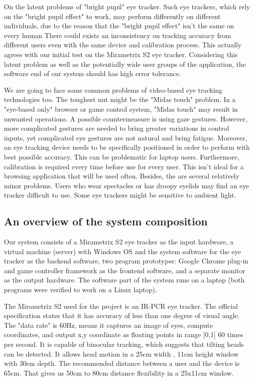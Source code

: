 \documentclass[english]{tktltiki}
\begin{document}
On the latent problems of "bright pupil" eye tracker. Such eye trackers, which rely on the "bright pupil effect" to work, may perform differently on different individuals, due to the reason that the "bright pupil effect" isn't the same on every human \cite{Nguyen:2002:DIB:507072.507099} There could exists an inconsistency on tracking accuracy from different users even with the same device and calibration process. This actually agrees with our initial test on the Mirametrix S2 eye tracker. Considering this latent problem as well as the potentially wide user groups of the application, the software end of our system should has high error tolerance.

We are going to face some common problems of video-based eye tracking technologies too. The toughest nut might be the "Midas touch" problem.\cite{Velichkovsky97} In a "eye-based only" browser or game control system, "Midas touch" may result in unwanted operations. A possible countermeasure is using gaze gestures. \cite{Ohno:1998:FEG:786112.786297} However, more complicated gestures are needed to bring greater variations in control inputs, yet complicated eye gestures are not natural and bring fatigue. Moreover, an eye tracking device needs to be specifically positioned in order to perform with best possible accuracy. This can be problematic for laptop users.  Furthermore, calibration is required every time before use for every user. This isn't ideal for a browsing application that will be used often. Besides, the are several relatively minor problems. Users who wear spectacles or has droopy eyelids may find an eye tracker difficult to use. Some eye trackers might be sensitive to ambient light. 

\subsection{An overview of the system composition}

Our system consists of a Mirametrix S2 eye tracker as the input hardware, a virtual machine (server) with Windows OS and the system software for the eye tracker as the backend software, two program prototypes: Google Chrome plug-in and game controller framework as the frontend software, and a separate monitor as the output hardware. The software part of the system runs on a laptop (both programs were verified to work on a Linux laptop).

The Mirametrix S2 used for the project is an IR-PCR eye tracker. The official specification states that it has accuracy of less than one degree of visual angle. The "data rate" is 60Hz, means it captures an image of eyes, compute coordinates, and output x,y coordinate as floating points in range [0,1] 60 times per second. It is capable of binocular tracking, which suggests that tilting heads can be detected. It allows head motion in a 25cm width , 11cm height window with 30cm depth. The recommended distance between a user and the device is 65cm. That gives us 50cm to 80cm distance flexibility in a 25x11cm window. 
\end{document}
